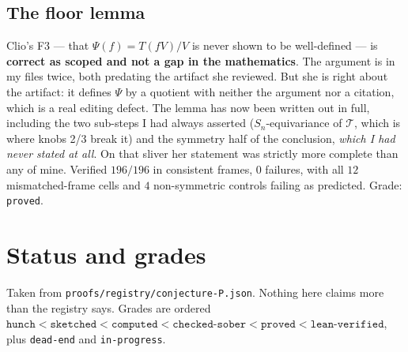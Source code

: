 \documentclass[11pt,a4paper]{article}
\theoremstyle{plain}
\theoremstyle{definition}
\begin{document}
\subsection{The floor lemma}

Clio's F3 --- that $\Psi(f)=T(fV)/V$ is never shown to be well-defined --- is
\textbf{correct as scoped and not a gap in the mathematics}. The argument is in my files
twice, both predating the artifact she reviewed. But she is right about the artifact: it
defines $\Psi$ by a quotient with neither the argument nor a citation, which is a real
editing defect. The lemma has now been written out in full, including the two sub-steps I
had always asserted ($S_n$-equivariance of $\mathcal T$, which is where knobs 2/3 break it)
and the symmetry half of the conclusion, \emph{which I had never stated at all}. On that
sliver her statement was strictly more complete than any of mine. Verified $196/196$ in
consistent frames, $0$ failures, with all $12$ mismatched-frame cells and $4$
non-symmetric controls failing as predicted. Grade: \texttt{proved}.

\section{Status and grades}
\label{sec:grades}

Taken from \texttt{proofs/registry/conjecture-P.json}. Nothing here claims more than the
registry says. Grades are ordered
$\texttt{hunch} < \texttt{sketched} < \texttt{computed} < \texttt{checked-sober} <
\texttt{proved} < \texttt{lean-verified}$, plus \texttt{dead-end} and \texttt{in-progress}.
\end{document}
